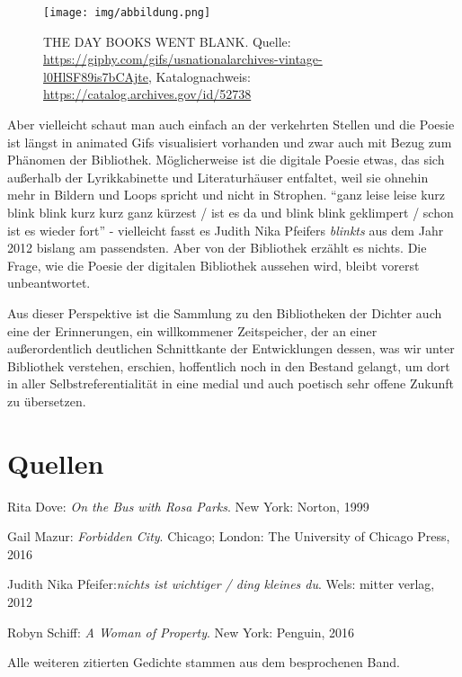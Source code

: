 \documentclass[a4paper,
fontsize=11pt,
oneside,
numbers=noperiodatend,
parskip=half-,
bibliography=totoc,
final
]{scrartcl}
\begin{document}
\begin{figure}
\centering
\texttt{[image: img/abbildung.png]}
\caption{THE DAY BOOKS WENT BLANK. Quelle:
\url{https://giphy.com/gifs/usnationalarchives-vintage-l0HlSF89is7bCAjte},
Katalognachweis: \url{https://catalog.archives.gov/id/52738}}
\end{figure}

Aber vielleicht schaut man auch einfach an der verkehrten Stellen und
die Poesie ist längst in animated Gifs visualisiert vorhanden und zwar
auch mit Bezug zum Phänomen der Bibliothek. Möglicherweise ist die
digitale Poesie etwas, das sich außerhalb der Lyrikkabinette und
Literaturhäuser entfaltet, weil sie ohnehin mehr in Bildern und Loops
spricht und nicht in Strophen. \enquote{ganz leise leise kurz blink
blink kurz kurz ganz kürzest / ist es da und blink blink geklimpert /
schon ist es wieder fort} - vielleicht fasst es Judith Nika Pfeifers
\emph{blinkts} aus dem Jahr 2012 bislang am passendsten. Aber von der
Bibliothek erzählt es nichts. Die Frage, wie die Poesie der digitalen
Bibliothek aussehen wird, bleibt vorerst unbeantwortet.

Aus dieser Perspektive ist die Sammlung zu den Bibliotheken der Dichter
auch eine der Erinnerungen, ein willkommener Zeitspeicher, der an einer
außerordentlich deutlichen Schnittkante der Entwicklungen dessen, was
wir unter Bibliothek verstehen, erschien, hoffentlich noch in den
Bestand gelangt, um dort in aller Selbstreferentialität in eine medial
und auch poetisch sehr offene Zukunft zu übersetzen.

\section*{Quellen}\label{quellen}

Rita Dove: \emph{On the Bus with Rosa Parks}. New York: Norton, 1999

Gail Mazur: \emph{Forbidden City}. Chicago; London: The University of
Chicago Press, 2016

Judith Nika Pfeifer:\emph{nichts ist wichtiger / ding kleines du}. Wels:
mitter verlag, 2012

Robyn Schiff: \emph{A Woman of Property}. New York: Penguin, 2016

Alle weiteren zitierten Gedichte stammen aus dem besprochenen Band.

\end{document}
